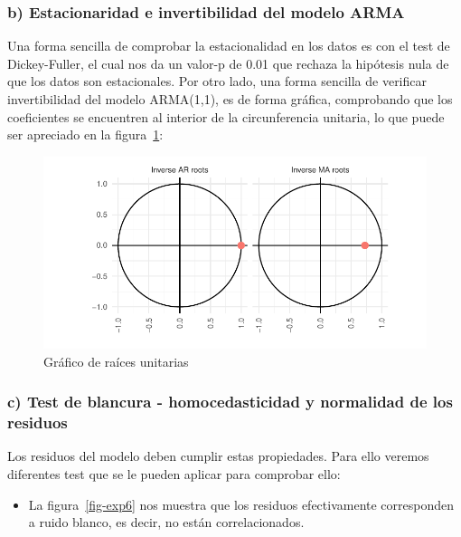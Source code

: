 \documentclass[
  letterpaper,
  DIV=11,
  numbers=noendperiod,
  twocolumn]{scrartcl}
\providecommand{\tightlist}{%
  \setlength{\itemsep}{0pt}\setlength{\parskip}{0pt}}\usepackage{longtable,booktabs,array}
\begin{document}
\hypertarget{b-estacionaridad-e-invertibilidad-del-modelo-arma}{%
\subsubsection{b) Estacionaridad e invertibilidad del modelo
ARMA}\label{b-estacionaridad-e-invertibilidad-del-modelo-arma}}

Una forma sencilla de comprobar la estacionalidad en los datos es con el
test de Dickey-Fuller, el cual nos da un valor-p de 0.01 que rechaza la
hipótesis nula de que los datos son estacionales. Por otro lado, una
forma sencilla de verificar invertibilidad del modelo ARMA(1,1), es de
forma gráfica, comprobando que los coeficientes se encuentren al
interior de la circunferencia unitaria, lo que puede ser apreciado en la
figura~\ref{fig-exp5}:

\begin{figure}[H]

{\centering \includegraphics{pdf_tarea2_files/figure-pdf/fig-exp5-1.pdf}

}

\caption{\label{fig-exp5}Gráfico de raíces unitarias}

\end{figure}

\hypertarget{c-test-de-blancura---homocedasticidad-y-normalidad-de-los-residuos}{%
\subsubsection{c) Test de blancura - homocedasticidad y normalidad de
los
residuos}\label{c-test-de-blancura---homocedasticidad-y-normalidad-de-los-residuos}}

Los residuos del modelo deben cumplir estas propiedades. Para ello
veremos diferentes test que se le pueden aplicar para comprobar ello:

\begin{itemize}
\tightlist
\item
  La figura~\ref{fig-exp6} nos muestra que los residuos efectivamente
  corresponden a ruido blanco, es decir, no están correlacionados.
\end{itemize}
\end{document}
